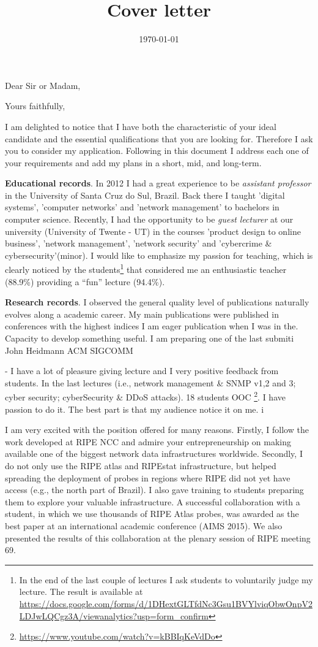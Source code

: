\documentclass[11pt,a4paper,sans]{moderncv}%
\title{Cover letter}
\begin{document}
\date{\today} %
\opening{Dear Sir or Madam,}
\closing{Yours faithfully,}

\makelettertitle

\justify
I am delighted to notice that I have both the characteristic of your ideal
candidate and the essential qualifications that you are looking for. Therefore I
ask you to consider my application. Following in this document I address each
one of your requirements and add my plans in a short, mid, and long-term.


\textbf{Educational records}. In 2012 I had a great experience to be \textit{assistant
professor} in the University of Santa Cruz do Sul, Brazil. Back there I
taught 'digital systems', 'computer networks' and 'network management' to
bachelors in computer science. Recently, I had the opportunity to be \textit{guest
lecturer} at our university (University of Twente - UT) in the courses 'product
design to online business', 'network management', 'network security' and
'cybercrime \& cybersecurity'(minor). I would like to emphasize my passion for
teaching, which is clearly noticed by the students\footnote{In the end of the last
couple of lectures I ask students to voluntarily judge my lecture. The result
is available at
\url{https://docs.google.com/forms/d/1DHextGLTfdNc3Gsu1BVYlviqObwOnpV2LDJwLQCgz3A/viewanalytics?usp=form_confirm}}
that considered me an enthusiastic teacher (88.9\%) providing a ``fun'' lecture
(94.4\%). 

\textbf{Research records}. I observed the general quality level of publications
naturally evolves along a academic career. My main publications
were published in conferences with the highest indices
I am eager 
publication when I was in the.  Capacity to develop something useful.
I am preparing one of the last submiti
John Heidmann ACM SIGCOMM

- I have a lot of pleasure giving lecture and I very positive feedback from
students. In the last lectures (i.e., network management \& SNMP v1,2 and 3;
cyber security; cyberSecurity \& DDoS attacks). 18 students
OOC \footnote{\url{https://www.youtube.com/watch?v=kBBIqKeVdDo}}.  I have passion to do it. The best part is that my audience notice it on
me.  i


I am very excited with the position offered for many reasons. Firstly, I follow
the work developed at RIPE NCC and admire your entrepreneurship on making
available one of the biggest network data infrastructures worldwide. Secondly, I
do not only use the RIPE atlas and RIPEstat infrastructure, but helped spreading
the deployment of probes in regions where RIPE did not yet have access (e.g.,
the north part of Brazil). I also gave training to students preparing them to
explore your valuable infrastructure. A successful collaboration with a student,
in which we use thousands of RIPE Atlas probes, was awarded as the best paper at
an international academic conference (AIMS 2015). We also presented the results
of this collaboration at the plenary session of RIPE meeting 69.
\end{document}
